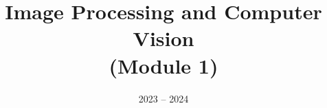 \documentclass[11pt]{ainotes}
\title{Image Processing and Computer Vision\\(Module 1)}
\date{2023 -- 2024}
\begin{document}
    
    \makenotesfront

    
    
\end{document}
